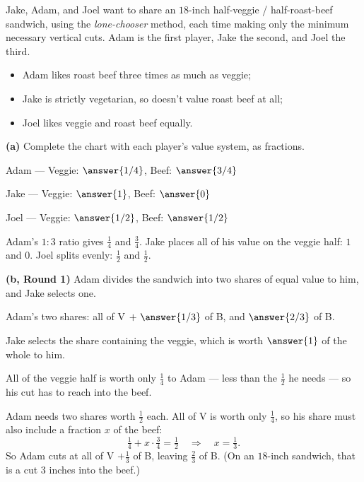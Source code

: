 \documentclass[12pt]{ximera}
\begin{document}
\begin{problem}
Jake, Adam, and Joel want to share an $18$-inch half-veggie / half-roast-beef sandwich,
using the \emph{lone-chooser} method, each time making only the minimum necessary
vertical cuts. Adam is the first player, Jake the second, and Joel the third.
\begin{itemize}
\item Adam likes roast beef three times as much as veggie;
\item Jake is strictly vegetarian, so doesn't value roast beef at all;
\item Joel likes veggie and roast beef equally.
\end{itemize}

\begin{prompt}
\textbf{(a)} Complete the chart with each player's value system, as fractions.

Adam --- Veggie: $\answer{1/4}$, \quad Beef: $\answer{3/4}$

\smallskip
Jake --- Veggie: $\answer{1}$, \quad Beef: $\answer{0}$

\smallskip
Joel --- Veggie: $\answer{1/2}$, \quad Beef: $\answer{1/2}$

\begin{feedback}
Adam's $1:3$ ratio gives $\frac14$ and $\frac34$. Jake places all of his value on the
veggie half: $1$ and $0$. Joel splits evenly: $\frac12$ and $\frac12$.
\end{feedback}
\end{prompt}

\begin{prompt}
\textbf{(b, Round 1)} Adam divides the sandwich into two shares of equal value to him,
and Jake selects one.

Adam's two shares: all of V $+\ \answer{1/3}$ of B, \quad and \quad $\answer{2/3}$ of B.

\smallskip
Jake selects the share containing the veggie, which is worth $\answer{1}$ of the whole
to him.

\begin{hint}
All of the veggie half is worth only $\frac14$ to Adam --- less than the $\frac12$ he
needs --- so his cut has to reach into the beef.
\end{hint}

\begin{feedback}
Adam needs two shares worth $\frac12$ each. All of V is worth only $\frac14$, so his
share must also include a fraction $x$ of the beef:
\[ \tfrac14 + x\cdot\tfrac34 = \tfrac12 \quad\Longrightarrow\quad x = \tfrac13. \]
So Adam cuts at all of V $+\frac13$ of B, leaving $\frac23$ of B. (On an $18$-inch
sandwich, that is a cut $3$ inches into the beef.)


\end{feedback}
\end{prompt}
\end{problem}
\end{document}
